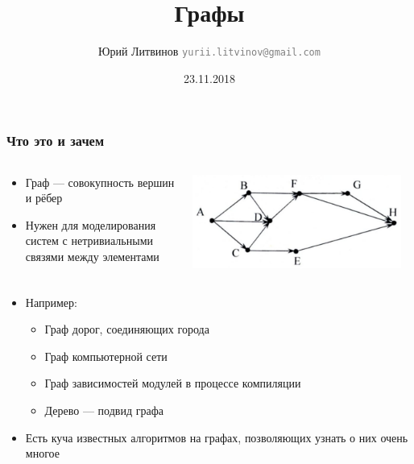 \documentclass[xetex,mathserif,serif]{beamer}
\title{Графы}
\author[Юрий Литвинов]{Юрий Литвинов \newline \textcolor{gray}{\small\texttt{yurii.litvinov@gmail.com}}}
\date{23.11.2018}
\begin{document}
	
	\frame{\titlepage}

	\begin{frame}
		\frametitle{Что это и зачем}
		\begin{columns}
			\begin{column}{0.4\textwidth}
				\begin{itemize}
					\item Граф --- совокупность вершин и рёбер
					\item Нужен для моделирования систем с нетривиальными связями между элементами
				\end{itemize}
			\end{column}
			\begin{column}{0.6\textwidth}
				\begin{center}
					\includegraphics[width=0.95\textwidth]{graph.png}
				\end{center}
			\end{column}
		\end{columns}
		\begin{itemize}
			\item Например:
			\begin{itemize}
				\item Граф дорог, соединяющих города
				\item Граф компьютерной сети
				\item Граф зависимостей модулей в процессе компиляции
				\item Дерево --- подвид графа
			\end{itemize}
			\item Есть куча известных алгоритмов на графах, позволяющих узнать о них очень многое
		\end{itemize}
	\end{frame}
\end{document}
